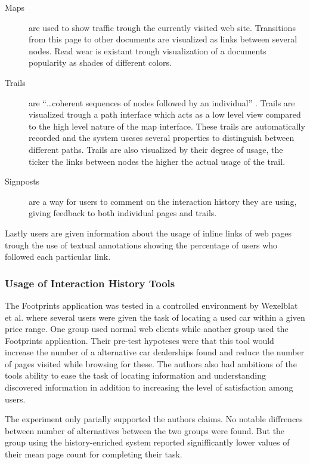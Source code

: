 \documentclass[12pt,a4paper]{article}
\begin{document}
\begin{description}
  \item[Maps] are used to show traffic trough the currently visited
    web site. Transitions from this page to other documents are visualized as
    links between several nodes. Read wear is existant trough visualization of
    a documents popularity as shades of different colors.
  \item[Trails] are ``\ldots coherent sequences of nodes followed by an
    individual'' \cite{wexelblat99}. Trails are visualized trough a path
    interface which acts as a low level view compared to the high level nature
    of the map interface. These trails are automatically recorded and the
    system useses several properties to distinguish between different paths.
    Trails are also visualized by their degree of usage, the ticker the links
    between nodes the higher the actual usage of the trail.
  \item[Signposts] are a way for users to comment on the interaction history
    they are using, giving feedback to both individual pages and trails.
\end{description}

Lastly users are given information about the usage of inline links of web
pages trough the use of textual annotations showing the percentage of users
who followed each particular link.

\subsubsection{Usage of Interaction History Tools}

The Footprints application was tested in a controlled environment by
Wexelblat et al. where several users were given the task of locating a used
car within a given price range. One group used normal web clients while
another group used the Footprints application.
Their pre-test hypoteses were that this tool
would increase the number of a alternative car dealerships found and reduce
the number of pages visited while browsing for these. The authors also had
ambitions of the tools ability to ease the task of locating
information and understanding discovered information in addition to
increasing the level of satisfaction among users.

The experiment only parially supported the authors claims. No notable
diffrences between number of alternatives between the two groups were found.
But the group using the history-enriched system reported signifficantly lower
values of their mean page count for completing their task.
\end{document}
